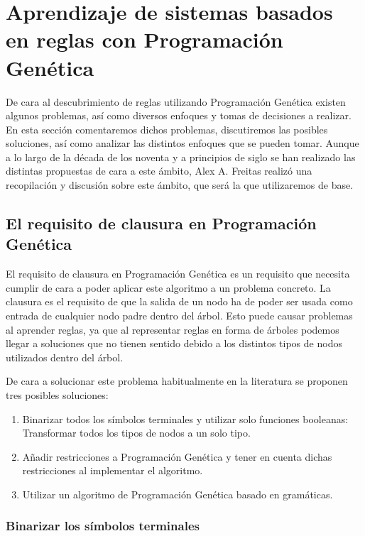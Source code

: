 \section{Aprendizaje de sistemas basados en reglas con Programación Genética}

De cara al descubrimiento de reglas utilizando Programación Genética existen algunos problemas, así como diversos enfoques y tomas de decisiones a realizar. En esta sección comentaremos dichos problemas, discutiremos las posibles soluciones, así como analizar las distintos enfoques que se pueden tomar. Aunque a lo largo de la década de los noventa y a principios de siglo se han realizado las distintas propuestas de cara a este ámbito, Alex A. Freitas \cite{dataMiningDescubrimientoReglasGeneticos} realizó una recopilación y discusión sobre este ámbito, que será la que utilizaremos de base.


\subsection{El requisito de clausura en Programación Genética}

El requisito de clausura en Programación Genética es un requisito que necesita cumplir de cara a poder aplicar este algoritmo a un problema concreto. La clausura es el requisito de que la salida de un nodo ha de poder ser usada como entrada de cualquier nodo padre dentro del árbol. Esto puede causar problemas al aprender reglas, ya que al representar reglas en forma de árboles podemos llegar a soluciones que no tienen sentido debido a los distintos tipos de nodos utilizados dentro del árbol.

De cara a solucionar este problema habitualmente en la literatura se proponen tres posibles soluciones:

\begin{enumerate}
	\item Binarizar todos los símbolos terminales y utilizar solo funciones booleanas: Transformar todos los tipos de nodos a un solo tipo.
	\item Añadir restricciones a Programación Genética y tener en cuenta dichas restricciones al implementar el algoritmo.
	\item Utilizar un algoritmo de Programación Genética basado en gramáticas.
\end{enumerate}

\subsubsection{Binarizar los símbolos terminales}

